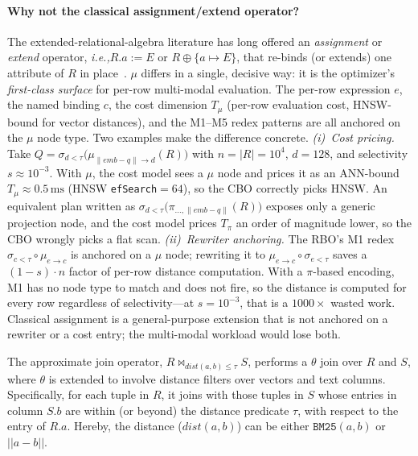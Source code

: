 \documentclass[sigconf]{acmart}
\theoremstyle{plain}
\theoremstyle{definition}
\newcommand{\ie}{\emph{i.e.,}\xspace}
\theoremstyle{remark}
\begin{document}
\paragraph{Why not the classical assignment/extend operator?}
The extended-relational-algebra literature has long offered an \emph{assignment} or \emph{extend} operator, \ie $R.a := E$ or $R \oplus \{a \mapsto E\}$, that re-binds (or extends) one attribute of $R$ in place~\cite{abiteboul1995foundations}. $\mu$ differs in a single, decisive way: it is the optimizer's \emph{first-class surface} for per-row multi-modal evaluation. The per-row expression $e$, the named binding $c$, the cost dimension $T_\mu$ (per-row evaluation cost, HNSW-bound for vector distances), and the M1--M5 redex patterns are all anchored on the $\mu$ node type. Two examples make the difference concrete. \emph{(i)~Cost pricing.} Take $Q = \sigma_{d<\tau}\bigl(\mu_{\lVert\mathit{emb}-q\rVert\to d}(R)\bigr)$ with $n = |R| = 10^4$, $d = 128$, and selectivity $s \approx 10^{-3}$. With $\mu$, the cost model sees a $\mu$ node and prices it as an ANN-bound $T_\mu \approx 0.5\,\mathrm{ms}$ (HNSW \texttt{efSearch}$=64$), so the CBO correctly picks HNSW. An equivalent plan written as $\sigma_{d<\tau}\bigl(\pi_{\dots, \lVert\mathit{emb}-q\rVert}(R)\bigr)$ exposes only a generic projection node, and the cost model prices $T_\pi$ an order of magnitude lower, so the CBO wrongly picks a flat scan. \emph{(ii)~Rewriter anchoring.} The RBO's M1 redex $\sigma_{c<\tau} \circ \mu_{e \to c}$ is anchored on a $\mu$ node; rewriting it to $\mu_{e \to c} \circ \sigma_{e < \tau}$ saves a $(1-s)\cdot n$ factor of per-row distance computation. With a $\pi$-based encoding, M1 has no node type to match and does not fire, so the distance is computed for every row regardless of selectivity---at $s = 10^{-3}$, that is a $1000\times$ wasted work. Classical assignment is a general-purpose extension that is not anchored on a rewriter or a cost entry; the multi-modal workload would lose both.

The approximate join operator, $R \bowtie_{dist(a,b)\le\tau} S$, performs a $\theta$ join over $R$ and $S$, where $\theta$ is extended to involve distance filters over vectors and text columns. Specifically, for each tuple in $R$, it joins with those tuples in $S$ whose entries in column $S.b$ are within (or beyond) the distance predicate $\tau$, with respect to the entry of $R.a$. Hereby, the distance (\(dist(a,b)\)) can be either \(\texttt{BM25}(a,b)\) or \(||a-b||\).
\end{document}
